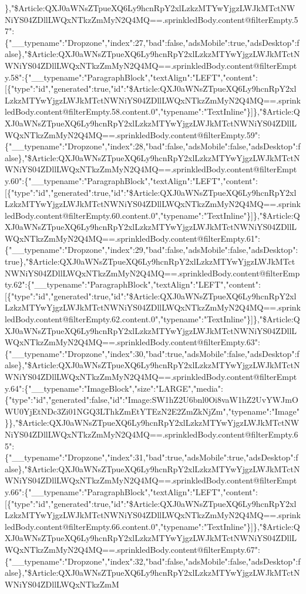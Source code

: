 \},"\$Article:QXJ0aWNsZTpueXQ6Ly9hcnRpY2xlLzkzMTYwYjgzLWJkMTctNWNiYS04ZDllLWQxNTkzZmMyN2Q4MQ==.sprinkledBody.content@filterEmpty.57":\{"\_\_typename":"Dropzone","index":27,"bad":false,"adsMobile":true,"adsDesktop":false\},"\$Article:QXJ0aWNsZTpueXQ6Ly9hcnRpY2xlLzkzMTYwYjgzLWJkMTctNWNiYS04ZDllLWQxNTkzZmMyN2Q4MQ==.sprinkledBody.content@filterEmpty.58":\{"\_\_typename":"ParagraphBlock","textAlign":"LEFT","content":{[}\{"type":"id","generated":true,"id":"\$Article:QXJ0aWNsZTpueXQ6Ly9hcnRpY2xlLzkzMTYwYjgzLWJkMTctNWNiYS04ZDllLWQxNTkzZmMyN2Q4MQ==.sprinkledBody.content@filterEmpty.58.content.0","typename":"TextInline"\}{]}\},"\$Article:QXJ0aWNsZTpueXQ6Ly9hcnRpY2xlLzkzMTYwYjgzLWJkMTctNWNiYS04ZDllLWQxNTkzZmMyN2Q4MQ==.sprinkledBody.content@filterEmpty.59":\{"\_\_typename":"Dropzone","index":28,"bad":false,"adsMobile":false,"adsDesktop":false\},"\$Article:QXJ0aWNsZTpueXQ6Ly9hcnRpY2xlLzkzMTYwYjgzLWJkMTctNWNiYS04ZDllLWQxNTkzZmMyN2Q4MQ==.sprinkledBody.content@filterEmpty.60":\{"\_\_typename":"ParagraphBlock","textAlign":"LEFT","content":{[}\{"type":"id","generated":true,"id":"\$Article:QXJ0aWNsZTpueXQ6Ly9hcnRpY2xlLzkzMTYwYjgzLWJkMTctNWNiYS04ZDllLWQxNTkzZmMyN2Q4MQ==.sprinkledBody.content@filterEmpty.60.content.0","typename":"TextInline"\}{]}\},"\$Article:QXJ0aWNsZTpueXQ6Ly9hcnRpY2xlLzkzMTYwYjgzLWJkMTctNWNiYS04ZDllLWQxNTkzZmMyN2Q4MQ==.sprinkledBody.content@filterEmpty.61":\{"\_\_typename":"Dropzone","index":29,"bad":false,"adsMobile":false,"adsDesktop":true\},"\$Article:QXJ0aWNsZTpueXQ6Ly9hcnRpY2xlLzkzMTYwYjgzLWJkMTctNWNiYS04ZDllLWQxNTkzZmMyN2Q4MQ==.sprinkledBody.content@filterEmpty.62":\{"\_\_typename":"ParagraphBlock","textAlign":"LEFT","content":{[}\{"type":"id","generated":true,"id":"\$Article:QXJ0aWNsZTpueXQ6Ly9hcnRpY2xlLzkzMTYwYjgzLWJkMTctNWNiYS04ZDllLWQxNTkzZmMyN2Q4MQ==.sprinkledBody.content@filterEmpty.62.content.0","typename":"TextInline"\}{]}\},"\$Article:QXJ0aWNsZTpueXQ6Ly9hcnRpY2xlLzkzMTYwYjgzLWJkMTctNWNiYS04ZDllLWQxNTkzZmMyN2Q4MQ==.sprinkledBody.content@filterEmpty.63":\{"\_\_typename":"Dropzone","index":30,"bad":true,"adsMobile":false,"adsDesktop":false\},"\$Article:QXJ0aWNsZTpueXQ6Ly9hcnRpY2xlLzkzMTYwYjgzLWJkMTctNWNiYS04ZDllLWQxNTkzZmMyN2Q4MQ==.sprinkledBody.content@filterEmpty.64":\{"\_\_typename":"ImageBlock","size":"LARGE","media":\{"type":"id","generated":false,"id":"Image:SW1hZ2U6bnl0Oi8vaW1hZ2UvYWJmOWU0YjEtNDc3Zi01NGQ3LThkZmEtYTEzN2E2ZmZkNjZm","typename":"Image"\}\},"\$Article:QXJ0aWNsZTpueXQ6Ly9hcnRpY2xlLzkzMTYwYjgzLWJkMTctNWNiYS04ZDllLWQxNTkzZmMyN2Q4MQ==.sprinkledBody.content@filterEmpty.65":\{"\_\_typename":"Dropzone","index":31,"bad":true,"adsMobile":true,"adsDesktop":false\},"\$Article:QXJ0aWNsZTpueXQ6Ly9hcnRpY2xlLzkzMTYwYjgzLWJkMTctNWNiYS04ZDllLWQxNTkzZmMyN2Q4MQ==.sprinkledBody.content@filterEmpty.66":\{"\_\_typename":"ParagraphBlock","textAlign":"LEFT","content":{[}\{"type":"id","generated":true,"id":"\$Article:QXJ0aWNsZTpueXQ6Ly9hcnRpY2xlLzkzMTYwYjgzLWJkMTctNWNiYS04ZDllLWQxNTkzZmMyN2Q4MQ==.sprinkledBody.content@filterEmpty.66.content.0","typename":"TextInline"\}{]}\},"\$Article:QXJ0aWNsZTpueXQ6Ly9hcnRpY2xlLzkzMTYwYjgzLWJkMTctNWNiYS04ZDllLWQxNTkzZmMyN2Q4MQ==.sprinkledBody.content@filterEmpty.67":\{"\_\_typename":"Dropzone","index":32,"bad":false,"adsMobile":false,"adsDesktop":false\},"\$Article:QXJ0aWNsZTpueXQ6Ly9hcnRpY2xlLzkzMTYwYjgzLWJkMTctNWNiYS04ZDllLWQxNTkzZmM